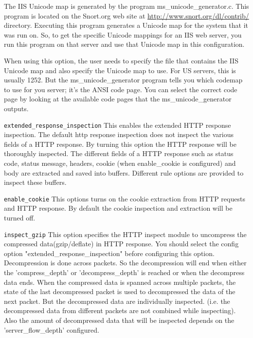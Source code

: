 \documentclass[english]{report}
\newcounter{slistnum}
\newenvironment{slist}
{ \begin{list}{ {\bf \arabic{slistnum}.} }{\usecounter{slistnum} } }
{ \end{list} }
\begin{document}
\begin{slist}
The IIS Unicode map is generated by the program ms\_unicode\_generator.c.  This
program is located on the Snort.org web site at
\url{http://www.snort.org/dl/contrib/} directory.  Executing this program
generates a Unicode map for the system that it was run on.  So, to get the
specific Unicode mappings for an IIS web server, you run this program on that
server and use that Unicode map in this configuration.

When using this option, the user needs to specify the file that contains the
IIS Unicode map and also specify the Unicode map to use.  For US servers, this
is usually 1252.  But the ms\_unicode\_generator program tells you which
codemap to use for you server; it's the ANSI code page.  You can select the
correct code page by looking at the available code pages that the
ms\_unicode\_generator outputs.

\item \texttt{extended\_response\_inspection}
This enables the extended HTTP response inspection. The default http response
inspection does not inspect the various fields of a HTTP response. By turning
this option the HTTP response will be thoroughly inspected. The different fields
of a HTTP response such as status code, status message, headers, cookie (when
enable\_cookie is configured) and body are extracted and saved into buffers.
Different rule options are provided to inspect these buffers.

\item \texttt{enable\_cookie}
This options turns on the cookie extraction from HTTP requests and HTTP response.
By default the cookie inspection and extraction will be turned off.

\item \texttt{inspect\_gzip}
This option specifies the HTTP inspect module to uncompress the compressed
data(gzip/deflate) in HTTP response. You should select the config option
"extended\_response\_inspection" before configuring this option.  Decompression 
is done across packets. So the decompression will end when either the 
'compress\_depth' or 'decompress\_depth' is reached or when the decompress data ends.
When the compressed data is spanned across multiple packets, the state of the last 
decompressed packet is used to decompressed the data of the next packet. 
But the decompressed data are individually inspected. (i.e. the 
decompressed data from different packets are not combined while inspecting). 
Also the amount of decompressed data that will be inspected depends on the 
'server\_flow\_depth' configured.


\end{slist}
\end{document}
